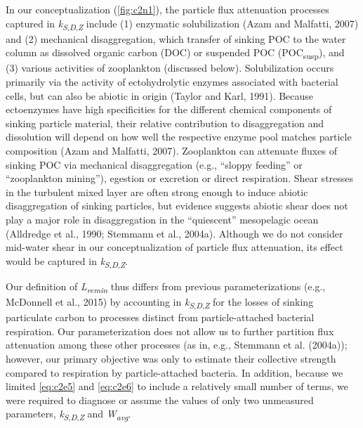 In our conceptualization (\autoref{fig:c2n1}), the particle flux attenuation processes captured in \emph{k\textsubscript{S}}\textsubscript{,\emph{D},\emph{Z}} include (1) enzymatic solubilization (Azam and Malfatti, 2007) and (2) mechanical disaggregation, which transfer of sinking POC to the water column as dissolved organic carbon (DOC) or suspended POC (POC\textsubscript{susp}), and (3) various activities of zooplankton (discussed below). Solubilization occurs primarily via the activity of ectohydrolytic enzymes associated with bacterial cells, but can also be abiotic in origin (Taylor and Karl, 1991). Because ectoenzymes have high specificities for the different chemical components of sinking particle material, their relative contribution to disaggregation and dissolution will depend on how well the respective enzyme pool matches particle composition (Azam and Malfatti, 2007). Zooplankton can attenuate fluxes of sinking POC via mechanical disaggregation (e.g., ``sloppy feeding'' or ``zooplankton mining''), egestion or excretion or direct respiration. Shear stresses in the turbulent mixed layer are often strong enough to induce abiotic disaggregation of sinking particles, but evidence suggests abiotic shear does not play a major role in disaggregation in the ``quiescent'' mesopelagic ocean (Alldredge et al., 1990; Stemmann et al., 2004a). Although we do not consider mid-water shear in our conceptualization of particle flux attenuation, its effect would be captured in \emph{k\textsubscript{S}}\textsubscript{,\emph{D},\emph{Z}}.

Our definition of \emph{L\textsubscript{remin}} thus differs from previous parameterizations (e.g., McDonnell et al., 2015) by accounting in \emph{k\textsubscript{S}}\textsubscript{,\emph{D},\emph{Z}} for the losses of sinking particulate carbon to processes distinct from particle-attached bacterial respiration. Our parameterization does not allow us to further partition flux attenuation among these other processes (as in, e.g., Stemmann et al. (2004a)); however, our primary objective was only to estimate their collective strength compared to respiration by particle-attached bacteria. In addition, because we limited \autoref{eq:c2e5} and \autoref{eq:c2e6} to include a relatively small number of terms, we were required to diagnose or assume the values of only two unmeasured parameters, \emph{k\textsubscript{S}}\textsubscript{,\emph{D},\emph{Z}} and \emph{W\textsubscript{avg}}.

